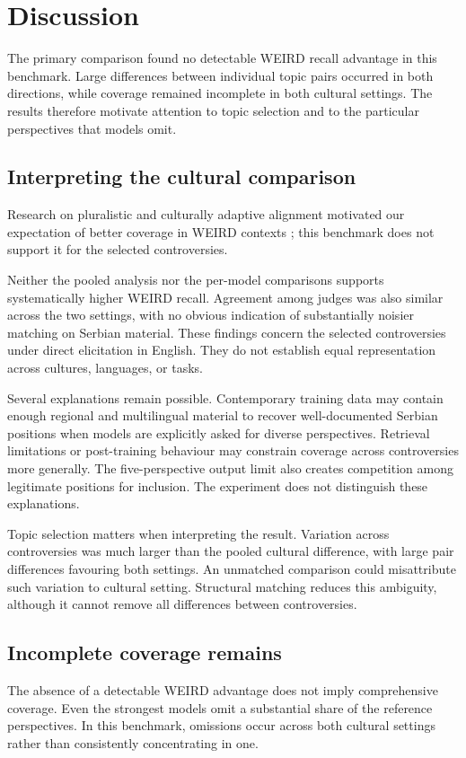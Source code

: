 \documentclass[11pt,a4paper]{article}
\begin{document}
\section{Discussion}
\label{sec:Discussion}
The primary comparison found no detectable WEIRD recall advantage in this benchmark. Large differences between individual topic pairs occurred in both directions, while coverage remained incomplete in both cultural settings. The results therefore motivate attention to topic selection and to the particular perspectives that models omit.


\subsection{Interpreting the cultural comparison}
Research on pluralistic and culturally adaptive alignment motivated our expectation of better coverage in WEIRD contexts \citep{sorensenRoadmapPluralisticAlignment2024,fengModularPluralismPluralistic2024,wangMultilingualPromptingImproving2025}; this benchmark does not support it for the selected controversies.

Neither the pooled analysis nor the per-model comparisons supports systematically higher WEIRD recall. Agreement among judges was also similar across the two settings, with no obvious indication of substantially noisier matching on Serbian material. These findings concern the selected controversies under direct elicitation in English. They do not establish equal representation across cultures, languages, or tasks.

Several explanations remain possible. Contemporary training data may contain enough regional and multilingual material to recover well-documented Serbian positions when models are explicitly asked for diverse perspectives. Retrieval limitations or post-training behaviour may constrain coverage across controversies more generally. The five-perspective output limit also creates competition among legitimate positions for inclusion. The experiment does not distinguish these explanations.

Topic selection matters when interpreting the result. Variation across controversies was much larger than the pooled cultural difference, with large pair differences favouring both settings. An unmatched comparison could misattribute such variation to cultural setting. Structural matching reduces this ambiguity, although it cannot remove all differences between controversies.

\subsection{Incomplete coverage remains}
\label{sec:Incomplete coverage remains the main problem}
The absence of a detectable WEIRD advantage does not imply comprehensive coverage. Even the strongest models omit a substantial share of the reference perspectives. In this benchmark, omissions occur across both cultural settings rather than consistently concentrating in one.
\end{document}
